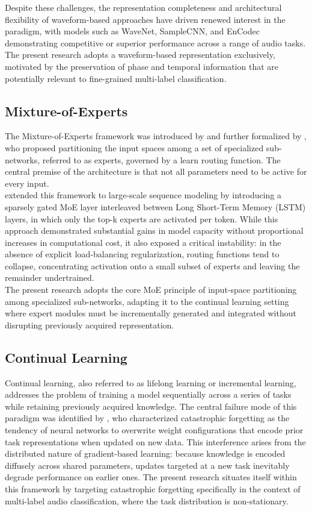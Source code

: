 \documentclass{article}
\begin{document}
\noindent Despite these challenges, the representation completeness and architectural flexibility of waveform-based approaches have driven renewed interest in the paradigm, with models such as WaveNet, SampleCNN, and EnCodec demonstrating competitive or superior performance across a range of audio tasks. The present research adopts a waveform-based representation exclusively, motivated by the preservation of phase and temporal information that are potentially relevant to fine-grained multi-label classification.

\subsection{Mixture-of-Experts}
The Mixture-of-Experts framework was introduced by \textcite{Jacobs1991} and further formalized by \textcite{HMoE_Em}, who proposed partitioning the input spaces among a set of specialized sub-networks, referred to as experts, governed by a learn routing function. The central premise of the architecture is that not all parameters need to be active for every input.\\

\noindent \textcite{Outrageous} extended this framework to large-scale sequence modeling by introducing a sparsely gated MoE layer interleaved between Long Short-Term Memory (LSTM) layers, in which only the top-k experts are activated per token. While this approach demonstrated substantial gains in model capacity without proportional increases in computational cost, it also exposed a critical instability: in the absence of explicit load-balancing regularization, routing functions tend to collapse, concentrating activation onto a small subset of experts and leaving the remainder undertrained.\\

\noindent The present research adopts the core MoE principle of input-space partitioning among specialized sub-networks, adapting it to the continual learning setting where expert modules must be incrementally generated and integrated without disrupting previously acquired representation.

\subsection{Continual Learning}
Continual learning, also referred to as lifelong learning or incremental learning, addresses the problem of training a model sequentially across a series of tasks while retaining previously acquired knowledge. The central failure mode of this paradigm was identified by \textcite{CatastrophicI}, who characterized catastrophic forgetting as the tendency of neural networks to overwrite weight configurations that encode prior task representations when updated on new data. This interference arises from the distributed nature of gradient-based learning: because knowledge is encoded diffusely across shared parameters, updates targeted at a new task inevitably degrade performance on earlier ones. The present research situates itself within this framework by targeting catastrophic forgetting specifically in the context of multi-label audio classification, where the task distribution is non-stationary. 
\end{document}

